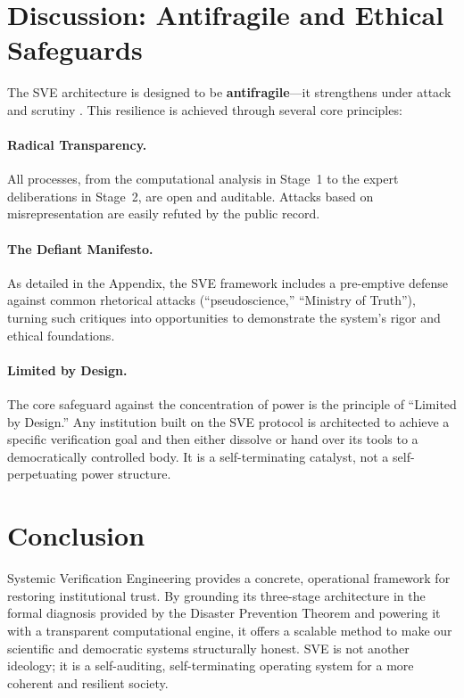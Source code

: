 \documentclass[11pt,a4paper]{article}
\theoremstyle{definition}
\begin{document}
\begin{small}
\section{Discussion: Antifragile and Ethical Safeguards}

The SVE architecture is designed to be \textbf{antifragile}---it strengthens under attack and scrutiny \citep{Taleb2012}. This resilience is achieved through several core principles:

\paragraph{Radical Transparency.} All processes, from the computational analysis in Stage~1 to the expert deliberations in Stage~2, are open and auditable. Attacks based on misrepresentation are easily refuted by the public record.

\paragraph{The Defiant Manifesto.} As detailed in the Appendix, the SVE framework includes a pre-emptive defense against common rhetorical attacks (``pseudoscience,'' ``Ministry of Truth''), turning such critiques into opportunities to demonstrate the system's rigor and ethical foundations.

\paragraph{Limited by Design.} The core safeguard against the concentration of power is the principle of ``Limited by Design.'' Any institution built on the SVE protocol is architected to achieve a specific verification goal and then either dissolve or hand over its tools to a democratically controlled body. It is a self-terminating catalyst, not a self-perpetuating power structure.

\section{Conclusion}

Systemic Verification Engineering provides a concrete, operational framework for restoring institutional trust. By grounding its three-stage architecture in the formal diagnosis provided by the Disaster Prevention Theorem and powering it with a transparent computational engine, it offers a scalable method to make our scientific and democratic systems structurally honest. SVE is not another ideology; it is a self-auditing, self-terminating operating system for a more coherent and resilient society.


\end{small}
\end{document}
